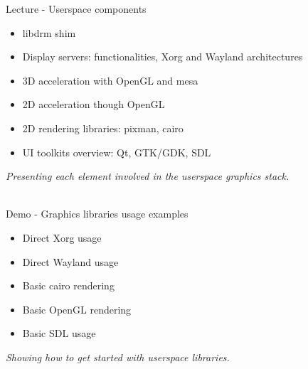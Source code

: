 \documentclass[a4paper,12pt,obeyspaces,spaces,hyphens]{article}
\begin{document}
\feagendaonecolumn
{Lecture - Userspace components}
{
  \begin{itemize}
  \item libdrm shim
  \item Display servers: functionalities, Xorg and Wayland architectures
  \item 3D acceleration with OpenGL and mesa
  \item 2D acceleration though OpenGL
  \item 2D rendering libraries: pixman, cairo
  \item UI toolkits overview: Qt, GTK/GDK, SDL
  \end{itemize}
  \vspace{0.5em}
  {\em Presenting each element involved in the userspace graphics stack.}
}
\\
\feagendaonecolumn
{Demo - Graphics libraries usage examples}
{
  \begin{itemize}
  \item Direct Xorg usage
  \item Direct Wayland usage
  \item Basic cairo rendering
  \item Basic OpenGL rendering
  \item Basic SDL usage
  \end{itemize}
  \vspace{0.5em}
  {\em Showing how to get started with userspace libraries.}
}
\end{document}
